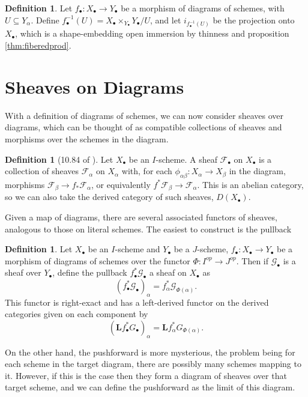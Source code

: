 \documentclass[proquest]{uwthesis}[2014/11/13]
\theoremstyle{definition}
\newtheorem{definition}[theorem]{Definition}
\newcommand{\FF}{\mathscr{F}}
\newcommand{\GG}{\mathscr{G}}
\newcommand{\bL}{\textbf{L}}
\begin{document}
\begin{definition}
	\label{def:diagrampreimage}
	Let $f_\bullet : X_\bullet \rightarrow Y_\bullet$ be a morphism of diagrams of schemes, with $U \subseteq Y_\alpha$.
	Define $f_\bullet^{-1}(U) = X_\bullet \times_{Y_\bullet} Y_\bullet / U$, and let $i_{f_\bullet^{-1} (U)}$ be the projection onto $X_\bullet$, which is a shape-embedding open immersion by thinness and proposition \ref{thm:fiberedprod}.
\end{definition}

\section{Sheaves on Diagrams}
With a definition of diagrams of schemes, we can now consider sheaves over diagrams, which can be thought of as compatible collections of sheaves and morphisms over the schemes in the diagram.

\begin{definition}[10.84 of \cite{Kollar2013}]
	Let $X_\bullet$ be an $I$-scheme.
	A sheaf $\FF_\bullet$ on $X_\bullet$ is a collection of sheaves $\FF_\alpha$ on $X_\alpha$ with, for each $\phi_{\alpha\beta} : X_\alpha \rightarrow X_\beta$ in the diagram, morphisms $\FF_\beta \rightarrow f_* \FF_\alpha$, or equivalently $f^* \FF_\beta \rightarrow \FF_\alpha$.
	This is an abelian category, so we can also take the derived category of such sheaves, $D(X_\bullet)$.
\end{definition}

Given a map of diagrams, there are several associated functors of sheaves, analogous to those on literal schemes.
The easiest to construct is the pullback

\begin{definition}
	Let $X_\bullet$ be an $I$-scheme and $Y_\bullet$ be a $J$-scheme, $f_\bullet : X_\bullet \rightarrow Y_\bullet$ be a morphism of diagrams of schemes over the functor $\Phi : I^{op} \rightarrow J^{op}$.
	Then if $\GG_\bullet$ is a sheaf over $Y_\bullet$, define the pullback $f^*_\bullet \GG_\bullet$ a sheaf on $X_\bullet$ as
	\[
	(f^*_\bullet \GG_\bullet)_\alpha = f_\alpha^* \GG_{\Phi(\alpha)}.
	\]
	This functor is right-exact and has a left-derived functor on the derived categories given on each component by
	\[
	(\bL f^*_\bullet G_\bullet)_\alpha = \bL f_\alpha^* G_{\Phi(\alpha)}.
	\]
\end{definition}

On the other hand, the pushforward is more mysterious, the problem being for each scheme in the target diagram, there are possibly many schemes mapping to it.
However, if this is the case then they form a diagram of sheaves over that target scheme, and we can define the pushforward as the limit of this diagram.
\end{document}
